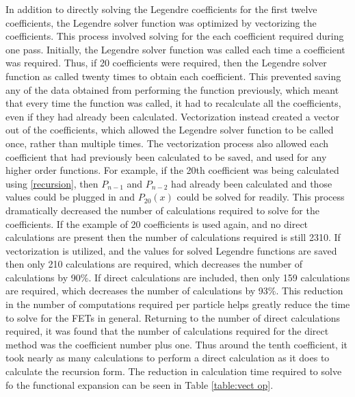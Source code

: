 \documentclass[10tma4paper]{article}
\begin{document}
In addition to directly solving the Legendre coefficients for the first twelve coefficients, the Legendre solver function was optimized by vectorizing the coefficients. This process involved solving for the each coefficient required during one pass. Initially, the Legendre solver function was called each time a coefficient was required. Thus, if 20 coefficients were required, then the Legendre solver function as called twenty times to obtain each coefficient. This prevented saving any of the data obtained from performing the function previously, which meant that every time the function was called, it had to recalculate all the coefficients, even if they had already been calculated. Vectorization instead created a vector out of the coefficients, which allowed the Legendre solver function to be called once, rather than multiple times. The vectorization process also allowed each coefficient that had previously been calculated to be saved, and used for any higher order functions. For example, if the 20th coefficient was being calculated using \eqref{recursion}, then $P_{n-1}$ and $P_{n-2}$ had already been calculated and those values could be plugged in and $P_{20}(x)$ could be solved for readily. This process dramatically decreased the number of calculations required to solve for the coefficients. If the example of 20 coefficients is used again, and no direct calculations are present then the number of calculations required is still 2310. If vectorization is utilized, and the values for solved Legendre functions are saved then only 210 calculations are required, which decreases the number of calculations by 90\%. If direct calculations are included, then only 159 calculations are required, which decreases the number of calculations by 93\%. This reduction in the number of computations required per particle helps greatly reduce the time to solve for the FETs in general. Returning to the number of direct calculations required, it was found that the number of calculations required for the direct method was the coefficient number plus one. Thus around the tenth coefficient, it took nearly as many calculations to perform a direct calculation as it does to calculate the recursion form. The reduction in calculation time required to solve fo the functional expansion can be seen in Table \ref{table:vect op}.
\end{document}
